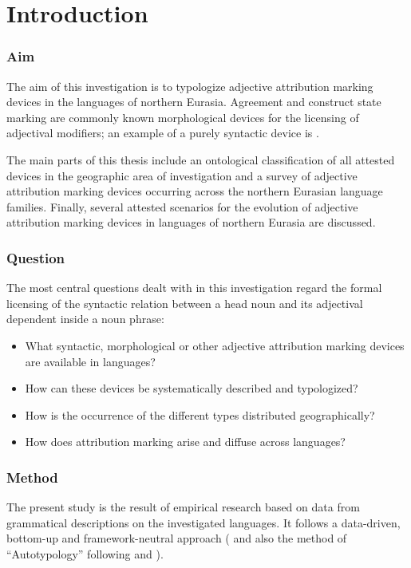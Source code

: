 
\chapter{Introduction}
\subsection*{Aim}
The aim of this investigation is to typologize adjective attribution marking devices in the languages of northern Eurasia. Agreement and construct state marking are commonly known morphological devices for the licensing of adjectival modifiers; an example of a purely syntactic device is .  

The main parts of this thesis include an ontological classification of all attested devices in the geographic area of investigation and a survey of adjective attribution marking devices occurring across the northern Eurasian language families. Finally, several attested scenarios for the evolution of adjective attribution marking devices in languages of northern Eurasia are discussed.

\subsection*{Question}
The most central questions dealt with in this investigation regard the formal licensing of the syntactic relation between a head noun and its adjectival dependent inside a noun phrase:
\begin{itemize}
\item What syntactic, morphological or other adjective attribution marking devices are available in languages? 
\item How can these devices be systematically described and typologized? 
\item How is the occurrence of the different types distributed geographically? 
\item How does attribution marking arise and diffuse across languages?
\end{itemize}

\subsection*{Method}
The present study is the result of empirical research based on data from grammatical descriptions on the investigated languages. It follows a data-driven, bottom-up and framework-neutral approach (\citealt[cf.][]{haspelmath2010} and also the method of “Autotypology” following \citealt{bickel-etal2002} and \citealt{bickel2007}).

